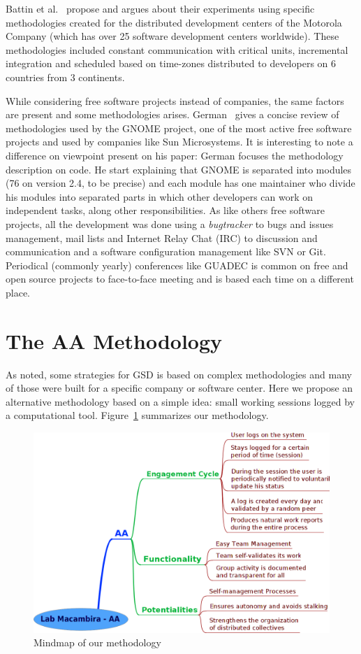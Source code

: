 \documentclass[letterpaper]{article}
\begin{document}
Battin et al.~\cite{battin2001} propose and argues about their experiments using
specific methodologies created for the distributed development centers of the
Motorola Company (which has over 25 software development centers
worldwide). These methodologies included constant communication with critical
units, incremental integration and scheduled based on time-zones distributed to
developers on 6 countries from 3 continents.

While considering free software projects instead of companies, the same factors
are present and some methodologies arises. German~\cite{german2003} gives a
concise review of methodologies used by the GNOME project, one of the most
active free software projects and used by companies like Sun Microsystems. It is
interesting to note a difference on viewpoint present on his paper: German
focuses the methodology description on code. He start explaining that GNOME is
separated into modules (76 on version 2.4, to be precise) and each module has
one maintainer who divide his modules into separated parts in which other
developers can work on independent tasks, along other responsibilities. As like
others free software projects, all the development was done using a
\emph{bugtracker} to bugs and issues management, mail lists and Internet Relay
Chat (IRC) to discussion and communication and a software configuration
management like SVN or Git. Periodical (commonly yearly) conferences like GUADEC
is common on free and open source projects to face-to-face meeting and is based
each time on a different place.

\section{The AA Methodology}
\label{aa-methodology}

As noted, some strategies for GSD is based on complex methodologies and many of
those were built for a specific company or software center. Here we propose an
alternative methodology based on a simple idea: small working sessions logged by
a computational tool. Figure~\ref{fig:mm} summarizes our methodology.

\begin{figure}
\begin{center}
   \includegraphics[width=0.8\linewidth,keepaspectratio=true]{figs/aa-mm.png}
\end{center}
   \caption{
   Mindmap of our methodology
   }
\label{fig:mm}
\end{figure}
\end{document}
